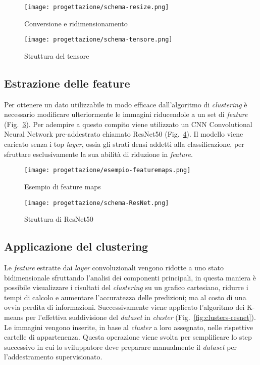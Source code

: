 \begin{figure}[!h] 
  \centering 
  \texttt{[image: progettazione/schema-resize.png]} 
  \caption{Conversione e ridimensionamento}
  \label{fig:schema-resize}
\end{figure}

\begin{figure}[!h] 
  \centering 
  \texttt{[image: progettazione/schema-tensore.png]} 
  \caption{Struttura del tensore}
  \label{fig:schema-tensore}
\end{figure}

\newpage


\subsection{Estrazione delle feature}
Per ottenere un dato utilizzabile in modo efficace dall'algoritmo di \emph{clustering} è necessario modificare ulteriormente le immagini riducendole a un set di \emph{feature} (Fig.~\ref{fig:featuremaps}).
Per adempire a questo compito viene utilizzato un CNN Convolutional Neural Network pre-addestrato chiamato ResNet50 (Fig.~\ref{fig:schema-resnet}).
Il modello viene caricato senza i top \emph{layer}, ossia gli strati densi addetti alla classificazione, per sfruttare esclusivamente la sua abilità di riduzione in \emph{feature}.

\begin{figure}[!h] 
  \centering 
  \texttt{[image: progettazione/esempio-featuremaps.png]} 
  \caption{Esempio di feature maps}
  \label{fig:featuremaps}
\end{figure}

\begin{figure}[!h] 
  \centering 
  \texttt{[image: progettazione/schema-ResNet.png]} 
  \caption{Struttura di ResNet50}
  \label{fig:schema-resnet}
\end{figure}



\subsection{Applicazione del clustering}
Le \emph{feature} estratte dai \emph{layer} convoluzionali vengono ridotte a uno stato bidimensionale sfruttando l'analisi dei componenti principali, in questa maniera è possibile visualizzare i risultati del \emph{clustering} su un grafico cartesiano, ridurre i tempi di calcolo e aumentare l'accuratezza delle predizioni; ma al costo di una ovvia perdita di informazioni.
Successivamente viene applicato l'algoritmo dei K-means per l'effettiva suddivisione del \emph{dataset} in \emph{cluster} (Fig.~\ref{fig:clusters-resnet}).
Le immagini vengono inserite, in base al \emph{cluster} a loro assegnato, nelle rispettive cartelle di appartenenza.
Questa operazione viene svolta per semplificare lo step successivo in cui lo sviluppatore deve preparare manualmente il \emph{dataset} per l'addestramento supervisionato.

